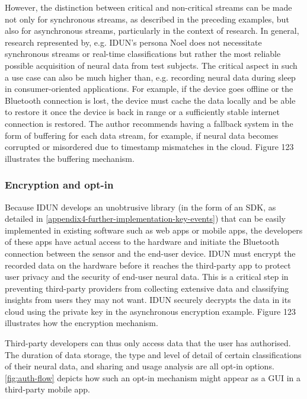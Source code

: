 However, the distinction between critical and non-critical streams can be made not only for synchronous streams, as described in the preceding examples, but also for asynchronous streams, particularly in the context of research. In general, research represented by, e.g. IDUN's persona Noel does not necessitate synchronous streams or real-time classifications but rather the most reliable possible acquisition of neural data from test subjects. The critical aspect in such a use case can also be much higher than, e.g. recording neural data during sleep in consumer-oriented applications. For example, if the device goes offline or the Bluetooth connection is lost, the device must cache the data locally and be able to restore it once the device is back in range or a sufficiently stable internet connection is restored. The author recommends having a fallback system in the form of buffering for each data stream, for example, if neural data becomes corrupted or misordered due to timestamp mismatches in the cloud. Figure 123 illustrates the buffering mechanism.


\subsubsection{Encryption and opt-in}
\label{chapter5-user-side-opt-in}

Because IDUN develops an unobtrusive library (in the form of an SDK, as detailed in \autoref{appendix4-further-implementation-key-events}) that can be easily implemented in existing software such as web apps or mobile apps, the developers of these apps have actual access to the hardware and initiate the Bluetooth connection between the sensor and the end-user device. IDUN must encrypt the recorded data on the hardware before it reaches the third-party app to protect user privacy and the security of end-user neural data. This is a critical step in preventing third-party providers from collecting extensive data and classifying insights from users they may not want. IDUN securely decrypts the data in its cloud using the private key in the asynchronous encryption example. Figure 123 illustrates how the encryption mechanism.


Third-party developers can thus only access data that the user has authorised. The duration of data storage, the type and level of detail of certain classifications of their neural data, and sharing and usage analysis are all opt-in options. \autoref{fig:auth-flow} depicts how such an opt-in mechanism might appear as a GUI in a third-party mobile app.

